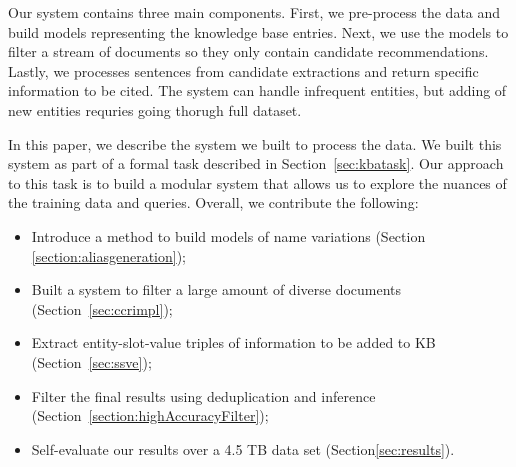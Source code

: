 Our system contains three main components. First, we pre-process the data and build models representing the knowledge base entries. Next, we use the models to filter a stream of documents so they only contain 
candidate recommendations. Lastly, we processes sentences from candidate extractions and return specific information to be cited. The system can handle infrequent entities, but adding of new entities requries going thorugh full dataset.


In this paper, we describe the system we built to process the data. We built this system as part of a formal task described in Section~\ref{sec:kbatask}. Our approach to this task is to build a modular system
that allows us to explore the nuances of the training data and queries. Overall, we contribute the following:
\begin{itemize}[noitemsep,nolistsep]
\item Introduce a method to build models of name variations (Section \ref{section:aliasgeneration});
\item Built a system to filter a large amount of diverse documents (Section~\ref{sec:ccrimpl});
\item Extract entity-slot-value triples of information to be added to KB (Section~\ref{sec:ssve});
\item Filter the final results using deduplication and inference (Section~\ref{section:highAccuracyFilter});
\item Self-evaluate our results over a 4.5 TB data set (Section\ref{sec:results}).
\end{itemize}





